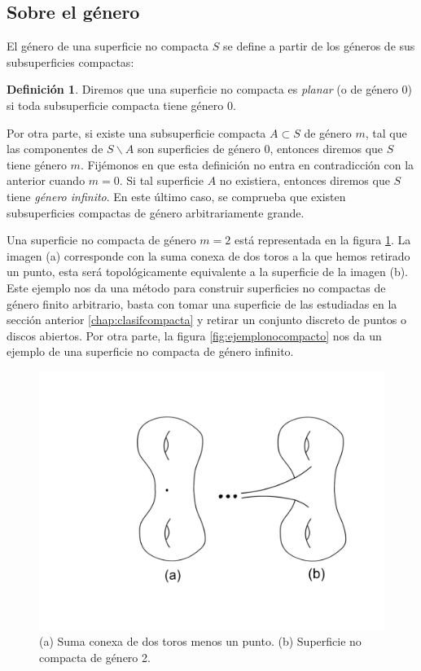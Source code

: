 \documentclass[a4paper,11pt,spanish, twoside, leqno]{tfg-uam}
\theoremstyle{definition}
\newtheorem{defin}[teor]{Definici\'on}
\begin{document}
\subsection*{Sobre el género}
El género de una superficie no compacta $S$ se define a partir de los géneros de sus subsuperficies compactas:
\begin{defin}
Diremos que una superficie no compacta es \textit{planar} (o de género 0) si toda subsuperficie compacta tiene género 0. 
\end{defin}
Por otra parte, si existe una subsuperficie compacta $A\subset S$ de género $m$, tal que las componentes de $S\backslash A$ son superficies de género 0, entonces diremos que $S$ tiene género $m$. Fijémonos en que esta definición no entra en contradicción con la anterior cuando $m=0$. Si tal superficie $A$ no existiera, entonces diremos que $S$ tiene \textit{género infinito}. En este último caso, se comprueba que existen subsuperficies compactas de género arbitrariamente grande.

Una superficie no compacta de género $m=2$ está representada en la figura \ref{fig:nocompactogenero2}. La imagen (a) corresponde con la suma conexa de dos toros a la que hemos retirado un punto, esta será topológicamente equivalente a la superficie de la imagen (b). Este ejemplo nos da una método para construir superficies no compactas de género finito arbitrario, basta con tomar una superficie de las estudiadas en la sección anterior \ref{chap:clasifcompacta} y retirar un conjunto discreto de puntos o discos abiertos. Por otra parte, la figura \ref{fig:ejemplonocompacto} nos da un ejemplo de una superficie no compacta de género infinito.

\begin{figure}[h!]
	\centering	\includegraphics[width=0.5\linewidth]{imagenes/ejemplonocompacta2.png}
	\caption{(a) Suma conexa de dos toros menos un punto.  (b) Superficie no compacta de género 2.}
	\label{fig:nocompactogenero2}
\end{figure}
\end{document}

